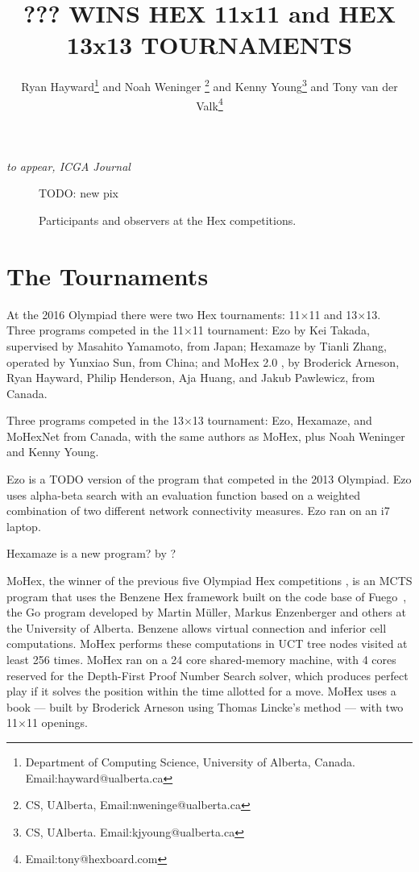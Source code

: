 \documentclass{icga}
\title{\sc ??? WINS HEX 11x11 and HEX 13x13 TOURNAMENTS}
\author{Ryan Hayward\thanks{Department 
of Computing Science, University of Alberta, Canada. Email:hayward@ualberta.ca} and
Noah Weninger \thanks{CS, UAlberta, Email:nweninge@ualberta.ca} and
Kenny Young\thanks{CS, UAlberta. Email:kjyoung@ualberta.ca} and
Tony van der Valk\thanks{Email:tony@hexboard.com}
}
\affiliation{Edmonton, Canada}
\def\Eo{\mbox{\sc Ezo}}
\def\Hz{\mbox{\sc Hexamaze}}
\def\Mx{\mbox{\sc MoHex}}
\def\Mt{\mbox{\sc MoHexNet}}
\def\Fuego{\mbox{\sc Fuego}}
\begin{document}
\maketitle

\vspace*{-2.25in}
{\it to appear, ICGA Journal}
\vspace*{2.0in}

\begin{figure}[hbt]
TODO: new pix

\caption{Participants and observers at the Hex competitions.}
\end{figure}


\section{The Tournaments}
At the 2016 Olympiad there were
two Hex tournaments: 11$\times$11 and 13$\times$13.
Three programs competed in the 11$\times$11 tournament:
\Eo{} by Kei Takada, supervised by Masahito Yamamoto, from Japan;
\Hz{} by Tianli Zhang, operated by Yunxiao Sun, from China; and
\Mx{} 2.0 , 
by Broderick Arneson, Ryan Hayward, Philip Henderson, Aja Huang, and Jakub Pawlewicz, from Canada.

Three programs competed in the 13$\times$13 tournament:
\Eo{}, \Hz{}, and \Mt{} from Canada,
with the same authors as \Mx{}, plus Noah Weninger and Kenny Young.

\Eo{} is a TODO version of the program that competed in the 2013 Olympiad.
\Eo{} uses alpha-beta search with an evaluation function based on
a weighted combination of two different network connectivity measures.
\Eo{} ran on an i7 laptop.

\Hz{} is a new program?  by ?  

\Mx{}, the winner of the previous five Olympiad Hex competitions
,
is an MCTS program that uses the Benzene Hex framework
built on the code base of \Fuego\ ,
the Go program developed by Martin M\"{u}ller, Markus Enzenberger
and others at the University of Alberta.
Benzene allows virtual connection and
inferior cell computations.
\Mx{} performs these computations in UCT tree nodes visited at least 256 times.
\Mx{} ran on a 24 core shared-memory machine, 
with 4 cores reserved for the 
Depth-First Proof Number Search solver, which
produces perfect play if it solves the
position within the time allotted for a move.
\Mx{} uses a book ---
built by Broderick Arneson using Thomas Lincke's method 
 ---
with two 11$\times$11 openings.
\end{document}
